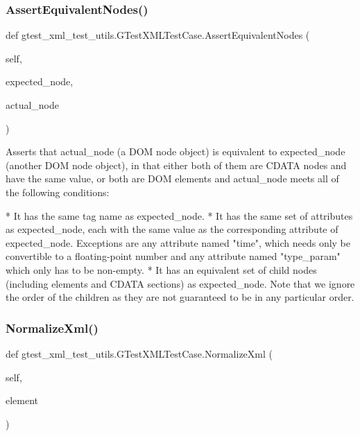 \subsubsection{\texorpdfstring{AssertEquivalentNodes()}{AssertEquivalentNodes()}}
{\footnotesize\ttfamily def gtest\+\_\+xml\+\_\+test\+\_\+utils.\+G\+Test\+X\+M\+L\+Test\+Case.\+Assert\+Equivalent\+Nodes (\begin{DoxyParamCaption}\item[{}]{self,  }\item[{}]{expected\+\_\+node,  }\item[{}]{actual\+\_\+node }\end{DoxyParamCaption})}

\begin{DoxyVerb}Asserts that actual_node (a DOM node object) is equivalent to
expected_node (another DOM node object), in that either both of
them are CDATA nodes and have the same value, or both are DOM
elements and actual_node meets all of the following conditions:

*  It has the same tag name as expected_node.
*  It has the same set of attributes as expected_node, each with
   the same value as the corresponding attribute of expected_node.
   Exceptions are any attribute named "time", which needs only be
   convertible to a floating-point number and any attribute named
   "type_param" which only has to be non-empty.
*  It has an equivalent set of child nodes (including elements and
   CDATA sections) as expected_node.  Note that we ignore the
   order of the children as they are not guaranteed to be in any
   particular order.
\end{DoxyVerb}
 \mbox{\label{classgtest__xml__test__utils_1_1_g_test_x_m_l_test_case_ac4823e96c3b5327b25a340a3605447d9}} 
\subsubsection{\texorpdfstring{NormalizeXml()}{NormalizeXml()}}
{\footnotesize\ttfamily def gtest\+\_\+xml\+\_\+test\+\_\+utils.\+G\+Test\+X\+M\+L\+Test\+Case.\+Normalize\+Xml (\begin{DoxyParamCaption}\item[{}]{self,  }\item[{}]{element }\end{DoxyParamCaption})}

